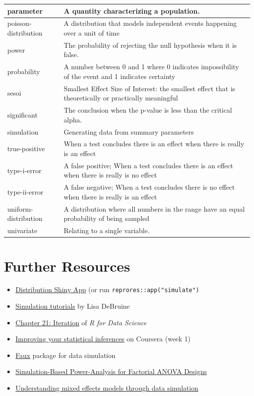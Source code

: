 \documentclass[
  oneside]{book}
\providecommand{\tightlist}{%
  \setlength{\itemsep}{0pt}\setlength{\parskip}{0pt}}
\begin{document}
\begin{tabular}{l|l}
\hline
parameter & A quantity characterizing a population.\\
\hline
poisson-distribution & A distribution that models independent events happening over a unit of time\\
\hline
power & The probability of rejecting the null hypothesis when it is false.\\
\hline
probability & A number between 0 and 1 where 0 indicates impossibility of the event and 1 indicates certainty\\
\hline
sesoi & Smallest Effect Size of Interest: the smallest effect that is theoretically or practically meaningful\\
\hline
significant & The conclusion when the p-value is less than the critical alpha.\\
\hline
simulation & Generating data from summary parameters\\
\hline
true-positive & When a test concludes there is an effect when there is really is an effect\\
\hline
type-i-error & A false positive; When a test concludes there is an effect when there is really is no effect\\
\hline
type-ii-error & A false negative; When a test concludes there is no effect when there is really is an effect\\
\hline
uniform-distribution & A distribution where all numbers in the range have an equal probability of being sampled\\
\hline
univariate & Relating to a single variable.\\
\hline
\end{tabular}

\hypertarget{resources8}{%
\section{Further Resources}\label{resources8}}

\begin{itemize}
\tightlist
\item
  \href{http://shiny.psy.gla.ac.uk/debruine/simulate/}{Distribution Shiny App} (or run \texttt{reprores::app("simulate")}
\item
  \href{https://debruine.github.io/data-sim-workshops/}{Simulation tutorials} by Lisa DeBruine
\item
  \href{http://r4ds.had.co.nz/iteration.html}{Chapter 21: Iteration} of \emph{R for Data Science}
\item
  \href{https://www.coursera.org/learn/statistical-inferences/}{Improving your statistical inferences} on Coursera (week 1)
\item
  \href{https://debruine.github.io/faux/}{Faux} package for data simulation
\item
  \href{https://psyarxiv.com/baxsf}{Simulation-Based Power-Analysis for Factorial ANOVA Designs} \citep{lakens_caldwell_2019}
\item
  \href{https://psyarxiv.com/xp5cy/}{Understanding mixed effects models through data simulation} \citep{debruine_barr_2019}
\end{itemize}
\end{document}
